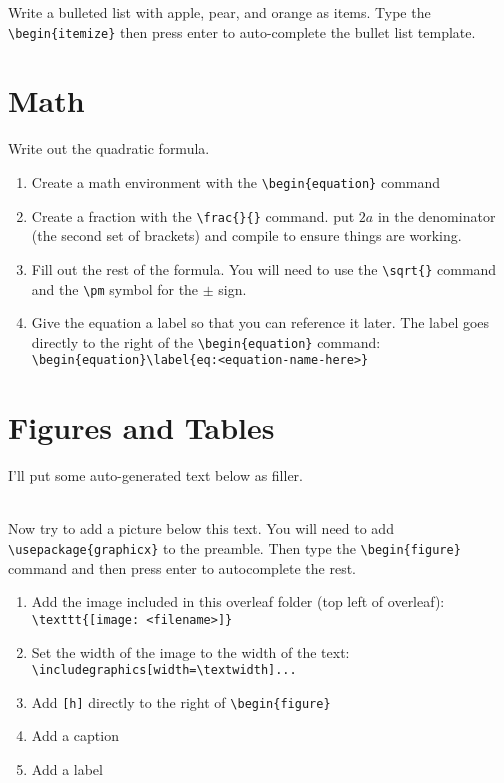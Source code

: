         Write a bulleted list with apple, pear, and orange as items. Type the \verb"\begin{itemize}" then press enter to auto-complete the bullet list template.


    \section{Math}
        Write out the quadratic formula.
        \begin{enumerate}
            \item Create a math environment with the \verb"\begin{equation}" command
            \item Create a fraction with the \verb"\frac{}{}" command. put $2a$ in the denominator (the second set of brackets) and compile to ensure things are working.
            \item Fill out the rest of the formula. You will need to use the \verb"\sqrt{}" command and the \verb"\pm" symbol for the $\pm$ sign.
            \item Give the equation a label so that you can reference it later. The label goes directly to the right of the \verb"\begin{equation}" command: \verb"\begin{equation}\label{eq:<equation-name-here>}"
        \end{enumerate}





    \section{Figures and Tables}
        I'll put some auto-generated text below as filler.

        \lipsum[1]\\

        Now try to add a picture below this text. You will need to add \verb"\usepackage{graphicx}" to the preamble. Then type the \verb"\begin{figure}" command and then press enter to autocomplete the rest.

        \begin{enumerate}
            \item Add the image included in this overleaf folder (top left of overleaf): \verb"\texttt{[image: <filename>]}"
            \item Set the width of the image to the width of the text:\\    \verb"\includegraphics[width=\textwidth]..."
            \item Add \verb"[h]" directly to the right of \verb"\begin{figure}"
            \item Add a caption
            \item Add a label
        \end{enumerate}

